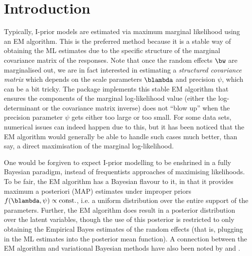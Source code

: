\documentclass[english, 11pt]{article}
\begin{document}

\newcommand{\Hlam}{\bH_\lambda}
\newcommand{\Vy}{\bV_y}
\newcommand{\liky}{(2\pi\psi)^{-n/2}\exp\left[-\frac{\Vert \by - }{2} \right]}





\section{Introduction}
\label{sec:intro}

Typically, I-prior models are estimated via maximum marginal likelihood using an EM algorithm. 
This is the preferred method because it is a stable way of obtaining the ML estimates due to the specific structure of the marginal covariance matrix of the responses. 
Note that once the random effects $\bw$ are marginalised out, we are in fact interested in estimating a \emph{structured covariance matrix} which depends on the scale parameters $\blambda$ and precision $\psi$, which can be a bit tricky. 
The  package implements this stable EM algorithm that ensures the components of the marginal log-likelihood value (either the log-determinant or the covariance matrix inverse) does not ``blow up'' when the precision parameter $\psi$ gets either too large or too small. 
For some data sets, numerical issues can indeed happen due to this, but it has been noticed that the EM algorithm would generally be able to handle such cases much better, than say, a direct maximisation of the marginal log-likelihood.


One would be forgiven to expect I-prior modelling to be enshrined in a fully Bayesian paradigm, instead of frequentists approaches of maximising likelihoods.
To be fair, the EM algorithm has a Bayesian flavour to it, in that it provides maximum a posteriori (MAP) estimates under improper priors $f(\blambda,\psi) \propto \text{const.}$, i.e. a uniform distribution over the entire support of the parameters. 
Further, the EM algorithm does result in a posterior distribution over the latent variables, though the use of this posterior is restricted to only obtaining the Empirical Bayes estimates of the random effects (that is, plugging in the ML estimates into the posterior mean function).
A connection between the EM algorithm and variational Bayesian methods have also been noted by \citet[p. 337]{gelman2014bayesian} and \cite{neal1998view}.
\end{document}
